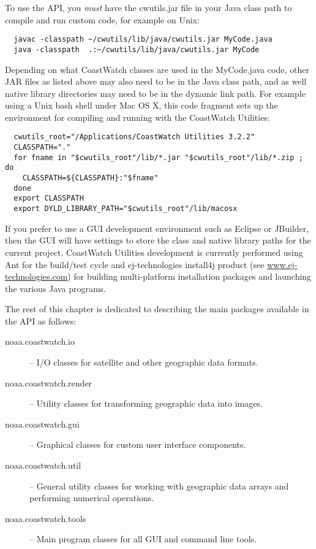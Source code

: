 {To use the API, you {\em must} have the {\file cwutils.jar} file in
your Java class path to compile and run custom code, for example
on Unix:
\begin{verbatim}
  javac -classpath ~/cwutils/lib/java/cwutils.jar MyCode.java
  java -classpath  .:~/cwutils/lib/java/cwutils.jar MyCode
\end{verbatim}
Depending on what CoastWatch classes are used in the
{\file MyCode.java} code, other JAR files as listed above may also
need to be in the Java class path, and as well native library
directories may need to be in the dynamic link path.  For example
using a Unix bash shell under Mac OS X, this code fragment sets
up the environment for compiling and running with the CoastWatch
Utilities:
\begin{verbatim}
  cwutils_root="/Applications/CoastWatch Utilities 3.2.2"
  CLASSPATH="."
  for fname in "$cwutils_root"/lib/*.jar "$cwutils_root"/lib/*.zip ; do
    CLASSPATH=${CLASSPATH}:"$fname"
  done
  export CLASSPATH
  export DYLD_LIBRARY_PATH="$cwutils_root"/lib/macosx
\end{verbatim}
If you prefer to use a GUI development environment such as
Eclipse or JBuilder, then the GUI will have settings to store the
class and native library paths for the current project.
CoastWatch Utilities development is currently performed using Ant
for the build/test cycle and ej-technologies install4j product
(see \url{www.ej-technologies.com}) for building multi-platform
installation packages and launching the various Java programs.

The rest of this chapter is dedicated to describing the main
packages available in the API as follows:
\begin{description}

\item[{\java noaa.coastwatch.io}] -- I/O classes for satellite and
other geographic data formats.

\item[{\java noaa.coastwatch.render}] -- Utility classes for
transforming geographic data into images.

\item[{\java noaa.coastwatch.gui}] -- Graphical classes for custom
user interface components.

\item[{\java noaa.coastwatch.util}] -- General utility classes for
working with geographic data arrays and performing numerical
operations.

\item[{\java noaa.coastwatch.tools}] -- Main program classes for
all GUI and command line tools.


\end{description}}
